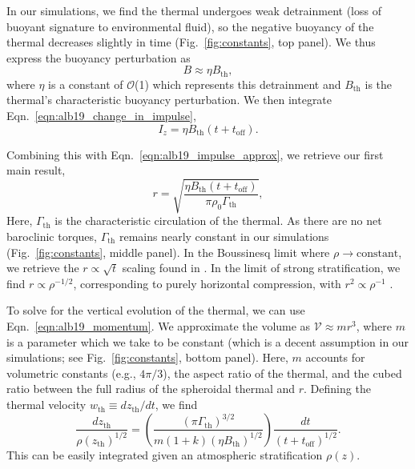 In our simulations, we find the thermal undergoes weak detrainment (loss of buoyant signature to environmental fluid), so the negative buoyancy of the thermal decreases slightly in time (Fig.~\ref{fig:constants}, top panel).
We thus express the buoyancy perturbation as 
\begin{equation}
B \approx \eta B_{\text{th}},
\end{equation}
where $\eta$ is a constant of $\mathcal{O}$(1) which represents this detrainment and $B_{\text{th}}$ is the thermal's characteristic buoyancy perturbation. 
We then integrate Eqn.~\ref{eqn:alb19_change_in_impulse},
\begin{equation*}
I_z = \eta B_{\text{th}} (t + t_{\text{off}}).
\end{equation*}

Combining this with Eqn.~\ref{eqn:alb19_impulse_approx}, we retrieve our first main result,
\begin{equation}
r = \sqrt{\frac{\eta B_{\text{th}} (t + t_{\text{off}})}{\pi\rho_0\Gamma_{\text{th}}}},
\label{eqn:alb19_r_theory}
\end{equation}
Here, $\Gamma_{\text{th}}$ is the characteristic circulation of the thermal. As there are no net baroclinic torques, $\Gamma_{\text{th}}$ remains nearly constant in our simulations (Fig.~\ref{fig:constants}, middle panel).
In the Boussinesq limit where $\rho \rightarrow \text{constant}$, we retrieve the $r \propto \sqrt{t}$ scaling found in \LJ.
In the limit of strong stratification, we find $r \propto \rho^{-1/2}$, corresponding to purely horizontal compression, with $r^2 \propto \rho^{-1}$ \citep{brandenburg2016}.

To solve for the vertical evolution of the thermal, we can use Eqn.~\ref{eqn:alb19_momentum}.
We approximate the volume as $\mathcal{V} \approx m r^3$, where $m$ is a parameter which we take to be constant (which is a decent assumption in our simulations; see Fig.~\ref{fig:constants}, bottom panel).
Here, $m$ accounts for volumetric constants (e.g., $4\pi/3$), the aspect ratio of the thermal, and the cubed ratio between the full radius of the spheroidal thermal and $r$.
Defining the thermal velocity $w_{\text{th}} \equiv dz_{\text{th}}/dt$, we find
\begin{equation}
\frac{dz_{\text{th}}}{\rho(z_{\text{th}})^{1/2}} =
\left(\frac{(\pi\Gamma_{\text{th}})^{3/2}}{m(1 + k)(\eta B_{\text{th}})^{1/2}}\right)\frac{dt}{(t + t_{\text{off}})^{1/2}}.
\label{eqn:alb19_dz_theory}
\end{equation}
This can be easily integrated given an atmospheric stratification $\rho(z)$.

